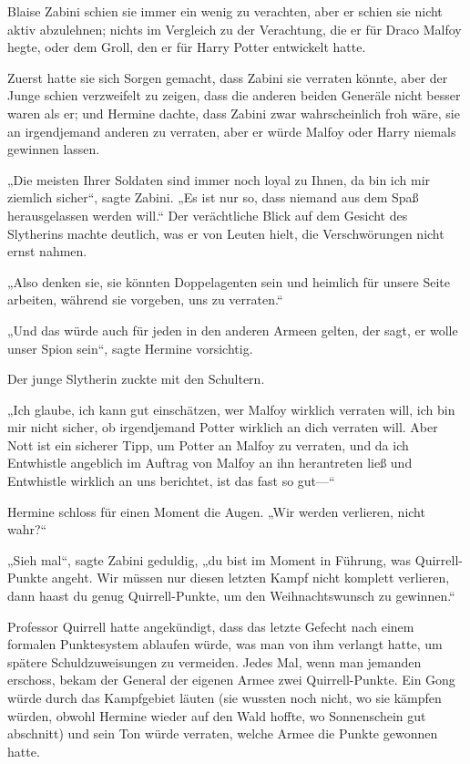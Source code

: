 {Blaise Zabini schien sie immer ein wenig zu verachten, aber er schien sie nicht aktiv abzulehnen; nichts im Vergleich zu der Verachtung, die er für Draco Malfoy hegte, oder dem Groll, den er für Harry Potter entwickelt hatte.

Zuerst hatte sie sich Sorgen gemacht, dass Zabini sie verraten könnte, aber der Junge schien verzweifelt zu zeigen, dass die anderen beiden Generäle nicht besser waren als er; und Hermine dachte, dass Zabini zwar wahrscheinlich froh wäre, sie an irgendjemand anderen zu verraten, aber er würde Malfoy oder Harry niemals gewinnen lassen.

„Die meisten Ihrer Soldaten sind immer noch loyal zu Ihnen, da bin ich mir ziemlich sicher“, sagte Zabini. „Es ist nur so, dass niemand aus dem Spaß herausgelassen werden will.“ Der verächtliche Blick auf dem Gesicht des Slytherins machte deutlich, was er von Leuten hielt, die Verschwörungen nicht ernst nahmen.

„Also denken sie, sie könnten Doppelagenten sein und heimlich für unsere Seite arbeiten, während sie vorgeben, uns zu verraten.“

„Und das würde auch für jeden in den anderen Armeen gelten, der sagt, er wolle unser Spion sein“, sagte Hermine vorsichtig.

Der junge Slytherin zuckte mit den Schultern.

„Ich glaube, ich kann gut einschätzen, wer Malfoy wirklich verraten will, ich bin mir nicht sicher, ob irgendjemand Potter wirklich an dich verraten will. Aber Nott ist ein sicherer Tipp, um Potter an Malfoy zu verraten, und da ich Entwhistle angeblich im Auftrag von Malfoy an ihn herantreten ließ und Entwhistle wirklich an uns berichtet, ist das fast so gut—“

Hermine schloss für einen Moment die Augen. „Wir werden verlieren, nicht wahr?“

„Sieh mal“, sagte Zabini geduldig, „du bist im Moment in Führung, was Quirrell-Punkte angeht. Wir müssen nur diesen letzten Kampf nicht komplett verlieren, dann haast du genug Quirrell-Punkte, um den Weihnachtswunsch zu gewinnen.“

Professor Quirrell hatte angekündigt, dass das letzte Gefecht nach einem formalen Punktesystem ablaufen würde, was man von ihm verlangt hatte, um spätere Schuldzuweisungen zu vermeiden. Jedes Mal, wenn man jemanden erschoss, bekam der General der eigenen Armee zwei Quirrell-Punkte. Ein Gong würde durch das Kampfgebiet läuten (sie wussten noch nicht, wo sie kämpfen würden, obwohl Hermine wieder auf den Wald hoffte, wo Sonnenschein gut abschnitt) und sein Ton würde verraten, welche Armee die Punkte gewonnen hatte.

}
